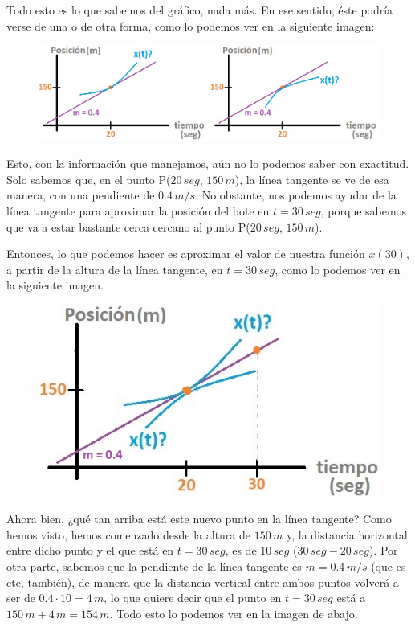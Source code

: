 \documentclass[12pt]{article}
\begin{document}
\newpage

Todo esto es lo que sabemos del gráfico, nada más. En ese sentido, éste podría verse de una o de otra forma, como lo podemos ver en la siguiente imagen:

\begin{figure}[hbt!]
\centering
\includegraphics[scale=0.6]{img/approx_lin_examp_3.jpg}
\end{figure}

Esto, con la información que manejamos, aún no lo podemos saber con exactitud. Solo sabemos que, en el punto P($20 \, seg$, $150 \, m$), la línea tangente se ve de esa manera, con una pendiente de $0.4 \, m/s$. No obstante, nos podemos ayudar de la línea tangente para aproximar la posición del bote en $t = 30 \, seg$, porque sabemos que va a estar bastante cerca cercano al punto P($20 \, seg$, $150 \, m$).

Entonces, lo que podemos hacer es aproximar el valor de nuestra función $x(30)$, a partir de la altura de la línea tangente, en $t = 30 \, seg$, como lo podemos ver en la siguiente imagen.

\begin{figure}[hbt!]
\centering
\includegraphics[scale=0.75]{img/approx_lin_examp_4.jpg}
\end{figure}

Ahora bien, ¿qué tan arriba está este nuevo punto en la línea tangente? Como hemos visto, hemos comenzado desde la altura de $150 \, m$ y, la distancia horizontal entre dicho punto y el que está en $t = 30 \, seg$, es de $10 \, seg$ ($30 \,seg - 20 \, seg$). Por otra parte, sabemos que la pendiente de la línea tangente es $m = 0.4 \, m/s$ (que es cte, también), de manera que la distancia vertical entre ambos puntos volverá a ser de $0.4 \cdot 10 = 4 \, m$, lo que quiere decir que el punto en $t = 30\, seg$ está a $150 \, m + 4 \, m = 154 \, m$. Todo esto lo podemos ver en la imagen de abajo.
\end{document}
